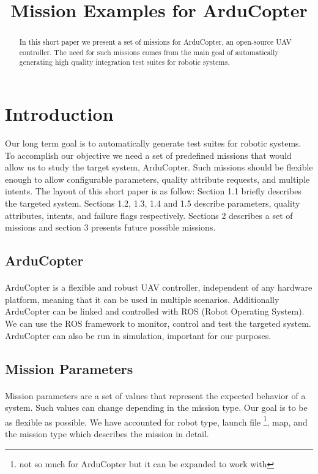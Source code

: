 \documentclass[12pt, a4paper]{article}
\title{Mission Examples for ArduCopter}
\begin{document}
\maketitle
	
	
\begin{abstract}
In this short paper we present a set of missions for ArduCopter, an open-source UAV controller. The need for such missions comes from the main goal of
automatically generating high quality integration test suites for robotic systems.  
\end{abstract}
	
	
\section{Introduction}
Our long term goal is to automatically generate test suites for robotic systems. To accomplish our objective we need a set of predefined missions that would allow us to study the target system, ArduCopter. Such missions should be flexible enough to allow configurable parameters, quality attribute requests, and multiple intents. The layout of this short paper is as follow: Section 1.1 briefly describes the targeted system. Sections 1.2, 1.3, 1.4 and 1.5 describe parameters, quality attributes, intents, and failure flags respectively. Sections 2 describes a set of missions and section 3 presents future possible missions.     
	
\subsection{ArduCopter}
\paragraph{}
ArduCopter is a flexible and robust UAV controller,  independent of any hardware platform, meaning that it can be used in multiple scenarios. Additionally ArduCopter can be linked and controlled with ROS (Robot Operating System). We can use the ROS framework to monitor, control and test the targeted system. ArduCopter can also be run in simulation, important for our purposes.  
	
\subsection{Mission Parameters}
\paragraph{}
Mission parameters are a set of values that represent the expected behavior of a system. Such values can change depending in the mission type. Our goal is to be as flexible as possible. We have accounted for robot type, launch file \footnote{not so much for ArduCopter but it can be expanded to work with}, map, and the mission type which describes the mission in detail.
	
\end{document}
